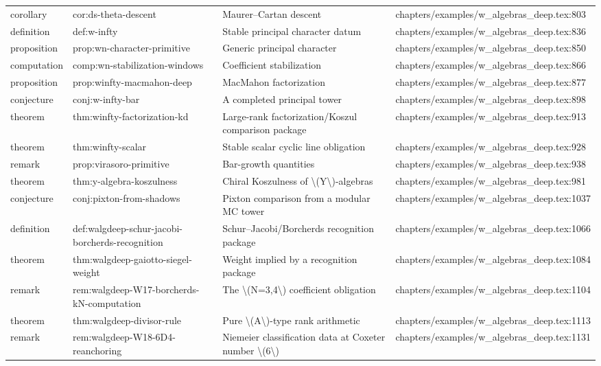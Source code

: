 \documentclass[11pt]{article}
\begin{document}
\begin{longtable}{L{0.10\textwidth}L{0.26\textwidth}L{0.42\textwidth}L{0.22\textwidth}}
corollary & cor:ds-theta-descent & Maurer--Cartan descent & chapters/examples/w\_algebras\_deep.tex:803\\
definition & def:w-infty & Stable principal character datum & chapters/examples/w\_algebras\_deep.tex:836\\
proposition & prop:wn-character-primitive & Generic principal character & chapters/examples/w\_algebras\_deep.tex:850\\
computation & comp:wn-stabilization-windows & Coefficient stabilization & chapters/examples/w\_algebras\_deep.tex:866\\
proposition & prop:winfty-macmahon-deep & MacMahon factorization & chapters/examples/w\_algebras\_deep.tex:877\\
conjecture & conj:w-infty-bar & A completed principal tower & chapters/examples/w\_algebras\_deep.tex:898\\
theorem & thm:winfty-factorization-kd & Large-rank factorization/Koszul comparison package & chapters/examples/w\_algebras\_deep.tex:913\\
theorem & thm:winfty-scalar & Stable scalar cyclic line obligation & chapters/examples/w\_algebras\_deep.tex:928\\
remark & prop:virasoro-primitive & Bar-growth quantities & chapters/examples/w\_algebras\_deep.tex:938\\
theorem & thm:y-algebra-koszulness & Chiral Koszulness of \textbackslash{}(Y\textbackslash{})-algebras & chapters/examples/w\_algebras\_deep.tex:981\\
conjecture & conj:pixton-from-shadows & Pixton comparison from a modular MC tower & chapters/examples/w\_algebras\_deep.tex:1037\\
definition & def:walgdeep-schur-jacobi-borcherds-recognition & Schur--Jacobi/Borcherds recognition package & chapters/examples/w\_algebras\_deep.tex:1066\\
theorem & thm:walgdeep-gaiotto-siegel-weight & Weight implied by a recognition package & chapters/examples/w\_algebras\_deep.tex:1084\\
remark & rem:walgdeep-W17-borcherds-kN-computation & The \textbackslash{}(N=3,4\textbackslash{}) coefficient obligation & chapters/examples/w\_algebras\_deep.tex:1104\\
theorem & thm:walgdeep-divisor-rule & Pure \textbackslash{}(A\textbackslash{})-type rank arithmetic & chapters/examples/w\_algebras\_deep.tex:1113\\
remark & rem:walgdeep-W18-6D4-reanchoring & Niemeier classification data at Coxeter number \textbackslash{}(6\textbackslash{}) & chapters/examples/w\_algebras\_deep.tex:1131\\

\end{longtable}
\end{document}
